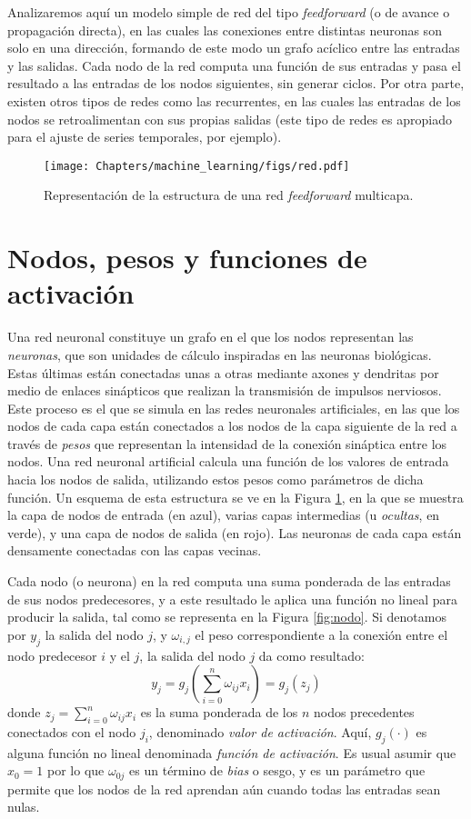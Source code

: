 Analizaremos aquí un modelo simple de red del tipo \textit{feedforward} (o de avance o propagación directa), en las cuales las conexiones entre distintas neuronas son solo en una dirección, formando de este modo un grafo acíclico entre las entradas y las salidas. Cada nodo de la red computa una función de sus entradas y pasa el resultado a las entradas de los nodos siguientes, sin generar ciclos. Por otra parte, existen otros tipos de redes como las recurrentes, en las cuales las entradas de los nodos se retroalimentan con sus propias salidas (este tipo de redes es apropiado para el ajuste de series temporales, por ejemplo).


\begin{figure}[t]
    \begin{center}
    \texttt{[image: Chapters/machine\_learning/figs/red.pdf]}
\end{center}
\caption{Representación de la estructura de una red \textit{feedforward} multicapa.}
\label{fig:red}
\end{figure}

\section{Nodos, pesos y funciones de activación}
Una red neuronal constituye un grafo en el que los nodos representan las \textit{neuronas}, que son unidades de cálculo inspiradas en las neuronas biológicas. Estas últimas están conectadas unas a otras mediante axones y dendritas por medio de enlaces sinápticos que realizan la transmisión de impulsos nerviosos. Este proceso es el que se simula en las redes neuronales artificiales, en las que los nodos de cada capa están conectados a los nodos de la capa siguiente de la red a través de \textit{pesos} que representan la intensidad de la conexión sináptica entre los nodos. Una red neuronal artificial calcula una función de los valores de entrada hacia los nodos de salida, utilizando estos pesos como parámetros de dicha función. Un esquema de esta estructura se ve en la Figura \ref{fig:red}, en la que se muestra la capa de nodos de entrada (en azul), varias capas intermedias (u \textit{ocultas}, en verde), y una capa de nodos de salida (en rojo). Las neuronas de cada capa están densamente conectadas con las capas vecinas.

Cada nodo (o neurona) en la red computa una suma ponderada de las entradas de sus nodos predecesores, y a este resultado le aplica una función no lineal para producir la salida, tal como se representa en la Figura \ref{fig:nodo}. Si denotamos por $y_j$ la salida del nodo $j$, y $\omega_{i,j}$ el peso correspondiente a la conexión entre el nodo predecesor $i$ y el $j$, la salida del nodo $j$ da como resultado:
\[ y_j = g_j\left(\sum_{i=0}^n \omega_{ij} x_i\right) = g_j(z_j) \]
donde $z_j = \sum_{i=0}^n \omega_{ij} x_i$ es la suma ponderada de los $n$ nodos precedentes conectados con el nodo $j_i$, denominado \textit{valor de activación}. Aquí, $g_j(\cdot)$ es alguna función no lineal denominada \textit{función de activación}. Es usual asumir que $x_0 = 1$ por lo que $\omega_{0j}$ es un término de \textit{bias} o sesgo, y es un parámetro que permite que los nodos de la red aprendan aún cuando todas las entradas sean nulas.

